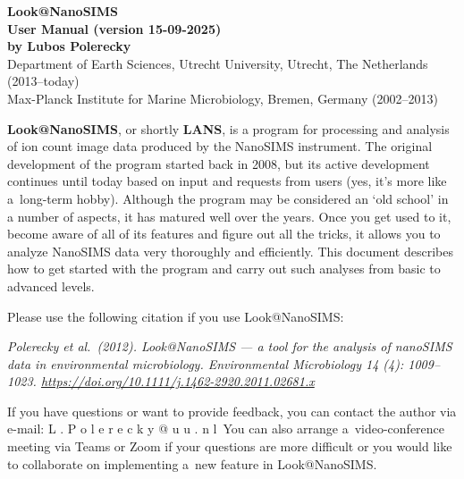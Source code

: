 \documentclass[a4paper, 11pt]{article}
\newcommand{\ttt}[1]{\textsf{#1}}
\begin{document}
\thispagestyle{empty}
\begin{center}
{\huge\bf Look@NanoSIMS}\\[4mm]
{\Large\bf User Manual (version 15-09-2025)}\\[12mm] 
{\Large\bf by Lubos Polerecky}\\[2mm]
{Department of Earth Sciences, Utrecht University, Utrecht, The Netherlands (2013--today)} \\%
{Max-Planck Institute for Marine Microbiology, Bremen, Germany (2002--2013)}\\[12mm]
\end{center}

\textbf{Look@NanoSIMS}, or shortly \textbf{LANS}, is a program for processing and analysis of ion count image data produced by the NanoSIMS instrument. The original development of the program started back in 2008, but its active development continues until today based on input and requests from users (yes, it's more like a~long-term hobby). Although the program may be considered an `old school' in a number of aspects, it has matured well over the years. Once you get used to it, become aware of all of its features and figure out all the tricks, it allows you to analyze NanoSIMS data very thoroughly and efficiently. This document describes how to get started with the program and carry out such analyses from basic to advanced levels. 
\tcbe

\vskip3mm
Please use the following citation if you use Look@NanoSIMS:
\begin{center}
\begin{minipage}{0.93\textwidth}
\textsl{\small Polerecky et al.~(2012). Look@NanoSIMS --- a tool for the analysis of nanoSIMS data in environmental microbiology. \textit{Environmental Microbiology} 14 (4): 1009--1023. \url{ https://doi.org/10.1111/j.1462-2920.2011.02681.x}}
\end{minipage}
\end{center}
\tcbe

\vskip3mm
If you have questions or want to provide feedback, you can contact the author via e-mail: 
\vskip1mm
\hfill \ttt{L . P o l e r e c k y @ u u . n l}\hfill\
\vskip1mm\noindent You can also arrange a~video-conference meeting via Teams or Zoom if your questions are more difficult or you would like to collaborate on implementing a~new feature in Look@NanoSIMS.
\tcbe
\end{document}
